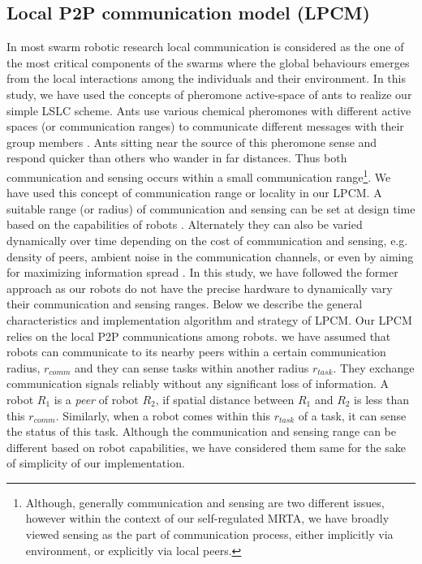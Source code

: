 \documentclass[journal]{IEEEtran}
\begin{document}
\subsection{Local P2P communication model (LPCM)}
In most swarm robotic research local communication is considered as the one of the most critical components of the swarms where the global behaviours emerges from the local interactions among the individuals and their environment. In this study, we have used the concepts of pheromone active-space of ants to realize our simple LSLC scheme. Ants use various chemical pheromones with different active spaces (or communication ranges) to communicate different messages with their group members \cite{Holldobler1990}. Ants sitting near the source of this pheromone sense and respond quicker than others who wander in far distances. Thus both communication and sensing occurs within a small communication range\footnote{Although, generally communication and sensing are two different issues, however within the context of our self-regulated MRTA, we have broadly viewed sensing as the part of communication process, either implicitly via environment, or explicitly via local peers.}. We have used this concept of communication range or locality in our LPCM. A suitable  range (or radius) of communication and sensing can be set at design time based on the capabilities of robots \cite{Agassounon+2002}. Alternately they can also be varied dynamically over time depending on the  cost of communication and sensing, e.g. density of peers, ambient noise in the communication channels, or even by aiming for maximizing information spread  \cite{Yoshida+2000}. In this study, we have followed the former approach as our robots do not have the precise hardware to dynamically vary their communication and sensing ranges. Below we describe the general characteristics and implementation algorithm and strategy of LPCM.
Our LPCM relies on the local P2P communications among robots. we have assumed that robots can communicate to its nearby peers within a certain communication radius, $r_{comm}$ and they can sense tasks within another radius $r_{task}$. They exchange communication signals reliably without any significant loss of information. A robot $R_1$ is a {\em peer} of robot $R_2$, if spatial distance between $R_1$ and $R_2$ is less than this $r_{comm}$.
Similarly, when a robot comes within this $r_{task}$ of a task, it can sense the status of this task. Although the communication and sensing  range can be different based on robot capabilities, we have considered them same for the sake of simplicity of our implementation.
\end{document}
